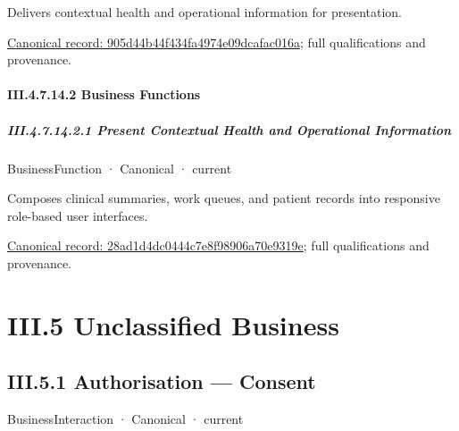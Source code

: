Delivers contextual health and operational information for presentation.


{\footnotesize \href{../../../../../../../continuum/business/business-service/905d44b44f434fa4974e09dcafac016a.md}{Canonical record: 905d44b44f434fa4974e09dcafac016a}; full qualifications and provenance.}\par
\subsubsection*{III.4.7.14.2 Business Functions}
\label{navigation:III.4.7.14.2}

\paragraph*{III.4.7.14.2.1 Present Contextual Health and Operational Information}
\label{navigation:III.4.7.14.2.1}

\label{element:28ad1d4dc0444c7e8f98906a70e9319e}
{\small BusinessFunction · Canonical · current}\par

Composes clinical summaries, work queues, and patient records into responsive role-based user interfaces.


{\footnotesize \href{../../../../../../../continuum/business/business-function/28ad1d4dc0444c7e8f98906a70e9319e.md}{Canonical record: 28ad1d4dc0444c7e8f98906a70e9319e}; full qualifications and provenance.}\par
\chapter*{III.5 Unclassified Business}
\label{navigation:III.5}

\section*{III.5.1 Authorisation — Consent}
\label{navigation:III.5.1}

\label{element:8c8a371f6a324d908656c3c935c7656f}
{\small BusinessInteraction · Canonical · current}\par

